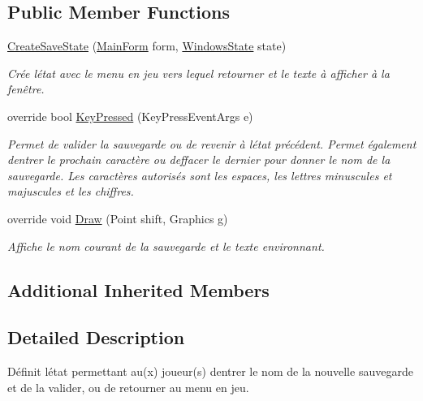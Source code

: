 \subsection*{Public Member Functions}
\begin{DoxyCompactItemize}
\item 
\hyperlink{class_tentacle_slicers_1_1windows_1_1_create_save_state_a91e1d436055ed7a3a759d3a23b832d1c}{Create\+Save\+State} (\hyperlink{class_tentacle_slicers_1_1windows_1_1_main_form}{Main\+Form} form, \hyperlink{class_tentacle_slicers_1_1windows_1_1_windows_state}{Windows\+State} state)
\begin{DoxyCompactList}\small\item\em Crée l\textquotesingle{}état avec le menu en jeu vers lequel retourner et le texte à afficher à la fenêtre. \end{DoxyCompactList}\item 
override bool \hyperlink{class_tentacle_slicers_1_1windows_1_1_create_save_state_a54077f2c7fdc69de077ab90cf110921d}{Key\+Pressed} (Key\+Press\+Event\+Args e)
\begin{DoxyCompactList}\small\item\em Permet de valider la sauvegarde ou de revenir à l\textquotesingle{}état précédent. Permet également d\textquotesingle{}entrer le prochain caractère ou d\textquotesingle{}effacer le dernier pour donner le nom de la sauvegarde. Les caractères autorisés sont les espaces, les lettres minuscules et majuscules et les chiffres. \end{DoxyCompactList}\item 
override void \hyperlink{class_tentacle_slicers_1_1windows_1_1_create_save_state_aeaa70c2f8e3d4279c54e7f8032f99465}{Draw} (Point shift, Graphics g)
\begin{DoxyCompactList}\small\item\em Affiche le nom courant de la sauvegarde et le texte environnant. \end{DoxyCompactList}\end{DoxyCompactItemize}
\subsection*{Additional Inherited Members}


\subsection{Detailed Description}
Définit l\textquotesingle{}état permettant au(x) joueur(s) d\textquotesingle{}entrer le nom de la nouvelle sauvegarde et de la valider, ou de retourner au menu en jeu. 



